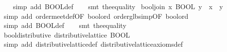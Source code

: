 \begin{isabellebody}
\ \ \isamarkupfalse%
\ {}simp\ add{}\ BOOL{}def{}\isanewline
\ \ \isamarkupfalse%
\ {}smt\ the{}equality{}%
\endisatagproof
{\isafoldproof}%
%
\isadelimproof
\isanewline
%
\endisadelimproof
\isanewline
{}\isamarkupfalse%
\ bool{}join{}\ {}x\ {}\isactrlbsub BOOL\isactrlesub \ y\ {}\ x\ {}\ y{}\isanewline
%
\isadelimproof
\ \ %
\endisadelimproof
%
\isatagproof
{}\isamarkupfalse%
\ {}simp\ add{}\ order{}meet{}def{}OF\ bool{}ord{}\ order{}glb{}simp{}OF\ bool{}ord{}{}\isanewline
\ \ \isamarkupfalse%
\ {}simp\ add{}\ BOOL{}def{}\isanewline
\ \ \isamarkupfalse%
\ {}smt\ the{}equality{}%
\endisatagproof
{\isafoldproof}%
%
\isadelimproof
\isanewline
%
\endisadelimproof
\isanewline
{}\isamarkupfalse%
\ bool{}distributive{}\ {}distributive{}lattice\ BOOL{}\isanewline
%
\isadelimproof
\ \ %
\endisadelimproof
%
\isatagproof
{}\isamarkupfalse%
\ {}simp\ add{}\ distributive{}lattice{}def\ distributive{}lattice{}axioms{}def{}\isanewline

\end{isabellebody}
